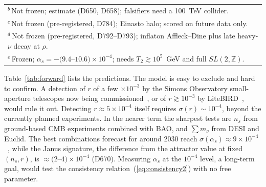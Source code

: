 \documentclass[aps,prd,twocolumn,superscriptaddress,nofootinbib,floatfix]{revtex4-2}
\begin{document}
\begin{table}[tbp]
\begin{ruledtabular}
\begin{tabular}{lll}
\multicolumn{3}{l}{$^b$\,Not frozen; estimate (D650, D658); falsifiers need a 100~TeV collider.} \\
\multicolumn{3}{l}{$^c$\,Not frozen (pre-registered, D784); Einasto halo; scored on future data only.} \\
\multicolumn{3}{l}{$^d$\,Not frozen (pre-registered, D792--D793); inflaton Affleck--Dine plus late heavy-$\nu$ decay at $\rho$.} \\
\multicolumn{3}{l}{$^e$\,Frozen; $\alpha_s=-(9.4$--$10.6)\times10^{-4}$; needs $T_2\gtrsim10^5$~GeV and full $SL(2,\mathbb{Z})$.} \\
\end{tabular}
\end{ruledtabular}
\end{table}

Table~\ref{tab:forward} lists the predictions. The model is easy to exclude and hard to confirm. A detection of $r$ of a few $\times10^{-3}$ by the Simons Observatory small-aperture telescopes now being commissioned~\cite{arXiv_2609_26938}, or of $r\gtrsim10^{-3}$ by LiteBIRD~\cite{arXiv_2202_02773}, would rule it out. Detecting $r\approx5\times10^{-4}$ itself requires $\sigma(r)\sim10^{-4}$, beyond the currently planned experiments. In the nearer term the sharpest tests are $n_s$ from ground-based CMB experiments combined with BAO, and $\sum m_\nu$ from DESI and Euclid. The best combinations forecast for around 2030 reach $\sigma(\alpha_s)\approx9\times10^{-4}$~\cite{arXiv_2212_04115}, while the Janus signature, the difference from the attractor value at fixed $(n_s,r)$, is $\approx(2$--$4)\times10^{-4}$ (D670). Measuring $\alpha_s$ at the $10^{-4}$ level, a long-term goal, would test the consistency relation~(\ref{eq:consistency2}) with no free parameter.
\end{document}
